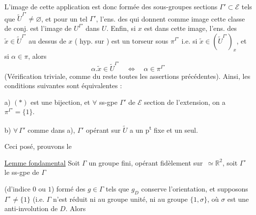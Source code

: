 
L'image de cette application est donc formée des  sous-groupes sections $\Gamma'\subset\mathcal E$ tels que $\widetilde U^{\Gamma'}\ne\varnothing$, et pour un tel $\Gamma'$, l'ens. des  qui  donnent comme image cette classe de conj. est l'image de $U^{\Gamma'}$ dans $U$. Enfin, si $x$ est dans cette image, l'ens.  des $\widetilde x\in\widetilde U^{\Gamma'}$ au dessus de $x$ (\deleted{\unsure{$\ne\varnothing$}} hyp. sur ) est un torseur sous $\pi^{\Gamma'}$ i.e. si $\widetilde x\in(\widetilde U^{\Gamma'})_x$,  et si $\alpha\in\pi$, alors
\[
\alpha.\widetilde x\in\widetilde U^{\Gamma'}\quad\Longleftrightarrow\quad\alpha\in\pi^{\Gamma'}
\]
(Vérification triviale, comme du reste toutes les assertions précédentes). Ainsi, les conditions suivantes sont équivalentes :


 a) $(*)$ est une bijection, et $\forall$ ss-gpe $\Gamma'$ de $\mathcal E$ section de l'extension,  on a $\pi^{\Gamma'}=\{1\}$.

 b) $\forall\,\Gamma'$ comme dans a), $\Gamma'$ opérant sur $\widetilde U$ a un p\textsuperscript{t} fixe et un seul.

Ceci posé, prouvons le

\uline{Lemme fondamental} Soit $\Gamma$ un groupe  fini, opérant fidèlement sur  \,$\simeq\mathbb R^2$, soit  $\Gamma^\circ$ le ss-gpe de $\Gamma$



(d'indice $0$ ou $1$) formé des $g\in\Gamma$ tels que $g_D$ conserve l'orientation, et supposons $\Gamma^\circ\ne\{1\}$ (i.e. $\Gamma$ n'est réduit ni au groupe unité, ni au groupe  $\{1,\sigma\}$, où $\sigma$ est une anti-involution de $D$. Alors

